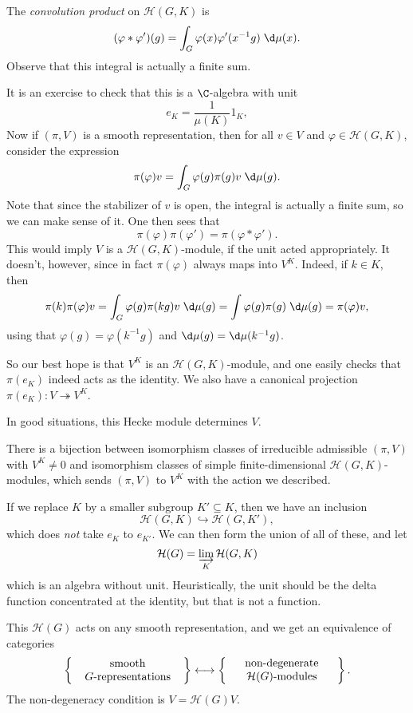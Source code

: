 \documentclass[a4paper]{article}
\begin{document}
\begin{defi}
  The \emph{convolution product} on $\mathcal{H}(G, K)$ is
  \[
    (\varphi * \varphi')(g) = \int_G \varphi(x) \varphi'(x^{-1}g)\;\d \mu(x).
  \]
  Observe that this integral is actually a finite sum.
\end{defi}

It is an exercise to check that this is a $\C$-algebra with unit
\[
  e_K = \frac{1}{\mu(K)} 1_K,
\]
Now if $(\pi, V)$ is a smooth representation, then for all $v \in V$ and $\varphi \in \mathcal{H}(G, K)$, consider the expression
\[
  \pi(\varphi)v = \int_G \varphi(g) \pi(g) v\;\d \mu(g).
\]
Note that since the stabilizer of $v$ is open, the integral is actually a finite sum, so we can make sense of it. One then sees that
\[
  \pi(\varphi) \pi(\varphi') = \pi(\varphi * \varphi').
\]
This would imply $V$ is a $\mathcal{H}(G, K)$-module, if the unit acted appropriately. It doesn't, however, since in fact $\pi(\varphi)$ always maps into $V^K$. Indeed, if $k \in K$, then
\[
  \pi(k) \pi(\varphi)v= \int_G \varphi(g) \pi(kg) v\;\d \mu(g) = \int \varphi(g) \pi(g)\;\d \mu(g) = \pi(\varphi) v,
\]
using that $\varphi(g) = \varphi(k^{-1}g)$ and $\d \mu(g) = \d \mu(k^{-1}g)$.

So our best hope is that $V^K$ is an $\mathcal{H}(G, K)$-module, and one easily checks that $\pi(e_K)$ indeed acts as the identity. We also have a canonical projection $\pi(e_K): V \twoheadrightarrow V^K$.

In good situations, this Hecke module determines $V$.
\begin{prop}
  There is a bijection between isomorphism classes of irreducible admissible $(\pi, V)$ with $V^K \not= 0$ and isomorphism classes of simple finite-dimensional $\mathcal{H}(G, K)$-modules, which sends $(\pi, V)$ to $V^K$ with the action we described.
\end{prop}

If we replace $K$ by a smaller subgroup $K' \subseteq K$, then we have an inclusion
\[
  \mathcal{H}(G, K) \hookrightarrow \mathcal{H}(G, K'),
\]
which does \emph{not} take $e_K$ to $e_{K'}$. We can then form the union of all of these, and let
\[
  \mathcal{H}(G) = \varinjlim_K \mathcal{H}(G, K)
\]
which is an algebra without unit. Heuristically, the unit should be the delta function concentrated at the identity, but that is not a function.

This $\mathcal{H}(G)$ acts on any smooth representation, and we get an equivalence of categories
\[
  \left\{\parbox{3.5cm}{\centering smooth $G$-representations}\right\} \longleftrightarrow \left\{\parbox{3.5 cm}{\centering non-degenerate $\mathcal{H}(G)$-modules}\right\}.
\]
The non-degeneracy condition is $V = \mathcal{H}(G) V$.
\end{document}
